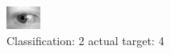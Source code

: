 \begin{figure}[h!]
\begin{center}
\includegraphics[width=0.60\columnwidth]{figures/ID693_class_2_target_4.png}
\end{center}
\caption{ Classification: 2 actual target: 4}
\label{fig:ID693_class_2_target_4}
\end{figure}
